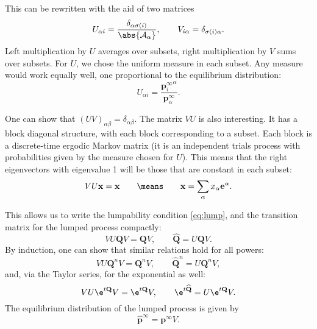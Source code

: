 \documentclass[12pt]{article}
\newcommand{\onev}{\mathbf{e}}
\newcommand{\MM}{\mathbf{Q}}
\newcommand{\eq}{\mathbf{p}^\infty}
\newcommand{\CA}{\mathcal{A}}
\begin{document}
This can be rewritten with the aid of two matrices
%
\begin{equation}\label{eq:lumpmats}
  U_{\alpha i} = \frac{\delta_{\alpha\sigma(i)}}{\abs{\CA_\alpha}},
  \qquad
  V_{i\alpha} = \delta_{\sigma(i)\alpha}.
\end{equation}
%
Left multiplication by $U$ averages over subsets, right multiplication by $V$ sums over subsets.
For $U$, we chose the uniform measure in each subset. Any measure would work equally well, \eg one proportional to the equilibrium distribution:
%
\begin{equation}\label{eq:altlumpmats}
  U_{\alpha i} = \frac{{\eq_i}^\alpha}{\eq_\alpha}.
\end{equation}
%

One can show that $(UV)_{\alpha\beta}=\delta_{\alpha\beta}$.
The matrix $VU$ is also interesting.
It has a block diagonal structure, with each block corresponding to a subset.
Each block is a discrete-time ergodic Markov matrix (it is an independent trials process with probabilities given by the measure chosen for $U$).
This means that the right eigenvectors with eigenvalue 1 will be those that are constant in each subset:
%
\begin{equation}\label{eq:setconst}
  VU\mathbf{x}=\mathbf{x}
  \qquad\means\qquad
  \mathbf{x} = \sum_\alpha x_\alpha \onev^\alpha.
\end{equation}
%

This allows us to write the lumpability condition \eqref{eq:lump}, and the transition matrix for the lumped process compactly:
%
\begin{equation}\label{eq:lumpcompact}
  VU\MM V = \MM V,
  \qquad
  \widehat{\MM} = U\MM V.
\end{equation}
%
By induction, one can show that similar relations hold for all powers:
%
\begin{equation}\label{eq:lumppower}
  VU\MM^nV = \MM^nV,
  \qquad
  \widehat{\MM}^n = U\MM^n V,
\end{equation}
%
and, via the Taylor series, for the exponential as well:
%
\begin{equation}\label{eq:lumpexp}
  VU \e^{t\MM} V = \e^{t\MM}V,
  \qquad
  \e^{t\widehat{\MM}} = U\e^{t\MM} V.
\end{equation}
%
The equilibrium distribution of the lumped process is given by
%
\begin{equation}\label{eq:lumpeq}
  \widehat{\mathbf{p}}^\infty = \eq V.
\end{equation}
%
\end{document}
